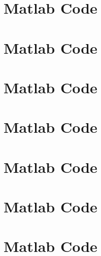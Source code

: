 \documentclass[a4paper,12pt]{article}
\begin{document}
\newpage
\section*{Matlab Code} 
\newpage
\section*{Matlab Code} 
\newpage
\section*{Matlab Code} 
\newpage
\section*{Matlab Code} 
\newpage
\section*{Matlab Code} 
\newpage
\section*{Matlab Code} 
\newpage
\section*{Matlab Code} 
\end{document}
